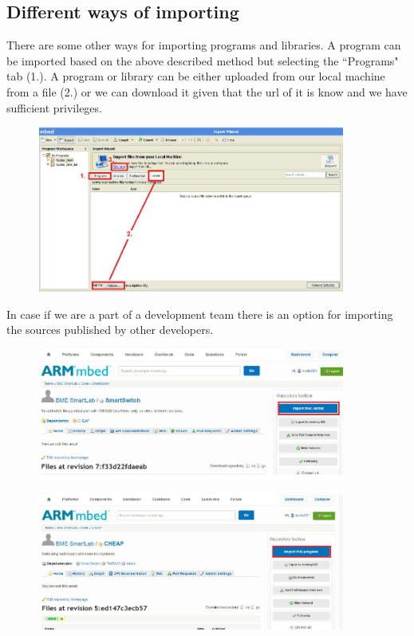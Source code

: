 \documentclass[a4paper]{article}
\begin{document}
\subsection{Different ways of importing}

There are some other ways for importing programs and libraries. A program can be imported based on the above described
method but selecting the ``Programs" tab (1.).
A program or library can be either uploaded from our local machine from a file (2.) or we can download it given that
the url of it is know and we have sufficient privileges.

\begin{figure}[H]
    \centering
    \includegraphics[width=0.9\textwidth]{figures/mbed-import2.png}
\end{figure}

In case if we are a part of a development team there is an option for importing the sources published by other
developers.

\begin{figure}[H]
    \centering
    \includegraphics[width=0.9\textwidth]{figures/mbed-online-import.png}
\end{figure}
\begin{figure}[H]
    \centering
    \includegraphics[width=0.9\textwidth]{figures/mbed-online-import2.png}
\end{figure}
\end{document}
